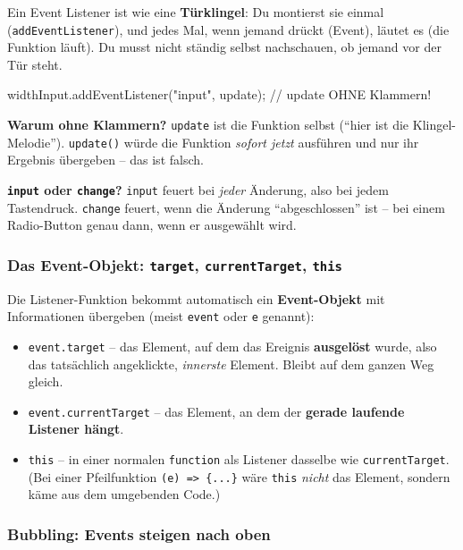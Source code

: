 \documentclass[a4paper,11pt]{article}
\begin{document}
\begin{analogie}
Ein Event Listener ist wie eine \textbf{Türklingel}: Du montierst sie einmal (\texttt{addEventListener}), und jedes Mal,
wenn jemand drückt (Event), läutet es (die Funktion läuft). Du musst nicht ständig selbst nachschauen, ob jemand
vor der Tür steht.
\end{analogie}

\begin{code}
widthInput.addEventListener("input", update);  // update OHNE Klammern!
\end{code}
\textbf{Warum ohne Klammern?} \lstinline|update| ist die Funktion selbst ("`hier ist die Klingel-Melodie"').
\lstinline|update()| würde die Funktion \emph{sofort jetzt} ausführen und nur ihr Ergebnis übergeben -- das ist falsch.

\textbf{\texttt{input} oder \texttt{change}?} \texttt{input} feuert bei \emph{jeder} Änderung, also bei jedem
Tastendruck. \texttt{change} feuert, wenn die Änderung "`abgeschlossen"' ist -- bei einem Radio-Button genau dann,
wenn er ausgewählt wird.

\subsubsection*{Das Event-Objekt: \texttt{target}, \texttt{currentTarget}, \texttt{this}}

Die Listener-Funktion bekommt automatisch ein \textbf{Event-Objekt} mit Informationen übergeben (meist
\texttt{event} oder \texttt{e} genannt):
\begin{itemize}[nosep]
\item \lstinline|event.target| -- das Element, auf dem das Ereignis \textbf{ausgelöst} wurde, also das tatsächlich
      angeklickte, \emph{innerste} Element. Bleibt auf dem ganzen Weg gleich.
\item \lstinline|event.currentTarget| -- das Element, an dem der \textbf{gerade laufende Listener hängt}.
\item \lstinline|this| -- in einer normalen \lstinline|function| als Listener dasselbe wie \texttt{currentTarget}.
      (Bei einer Pfeilfunktion \lstinline|(e) => {...}| wäre \texttt{this} \emph{nicht} das Element, sondern
      käme aus dem umgebenden Code.)
\end{itemize}

\subsubsection*{Bubbling: Events steigen nach oben}
\end{document}
